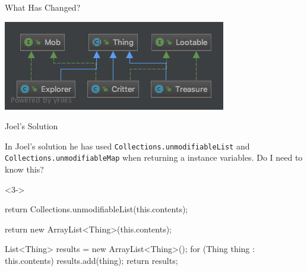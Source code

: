 \documentclass[12]{beamer}
\begin{document}
\begin{frame}[t]{What Has Changed?} \vspace{4pt}
\begin{center}
\includegraphics[scale=0.45]{resources/old_classes}\\[20pt]
\end{center}
\end{frame}

\begin{frame}[t, fragile]{Joel's Solution} \vspace{4pt}

In Joel's solution he has used \texttt{Collections.unmodifiableList} and \texttt{Collections.unmodifiableMap} when returning a instance variables. Do I need to know this?


\begin{onlyenv}<3->
\begin{java}
return Collections.unmodifiableList(this.contents);

return new ArrayList<Thing>(this.contents);

List<Thing> results = new ArrayList<Thing>();
for (Thing thing : this.contents) {
	results.add(thing);
}
return results;
\end{java}
\end{onlyenv}

\end{frame}
\end{document}

